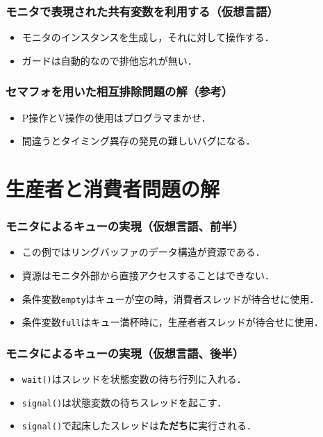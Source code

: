 \documentclass{beamer}                   %
\begin{document}
\begin{frame}
  \frametitle{モニタで表現された共有変数を利用する（仮想言語）}

  \begin{itemize}
  \item モニタのインスタンスを生成し，それに対して操作する．
  \item ガードは自動的なので排他忘れが無い．
  \end{itemize}
\end{frame}

\begin{frame}
  \frametitle{セマフォを用いた相互排除問題の解（参考）}

  \begin{itemize}
  \item P操作とV操作の使用はプログラマまかせ．
  \item 間違うとタイミング異存の発見の難しいバグになる．
  \end{itemize}
\end{frame}

\section{生産者と消費者問題の解}
\begin{frame}
  \frametitle{モニタによるキューの実現（仮想言語、前半）}

  \begin{itemize}
  \item この例ではリングバッファのデータ構造が資源である．
  \item 資源はモニタ外部から直接アクセスすることはできない．
  \item 条件変数{\tt empty}はキューが空の時，消費者スレッドが待合せに使用．
  \item 条件変数{\tt full}はキュー満杯時に，生産者者スレッドが待合せに使用．
  \end{itemize}
\end{frame}

\begin{frame}
  \frametitle{モニタによるキューの実現（仮想言語、後半）}

  \begin{itemize}
  \item {\tt wait()}はスレッドを状態変数の待ち行列に入れる．
  \item {\tt signal()}は状態変数の待ちスレッドを起こす．
  \item {\tt signal()}で起床したスレッドは{\bf ただちに}実行される．
  \end{itemize}
\end{frame}
\end{document}
